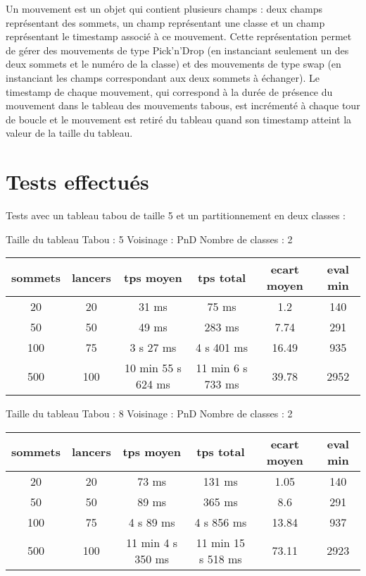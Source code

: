 \documentclass[12pt]{article}
\begin{document}
Un mouvement est un objet qui contient plusieurs champs : deux champs représentant des sommets, un champ représentant une classe et un champ représentant le timestamp associé à ce mouvement. Cette représentation permet de gérer des mouvements de type Pick’n’Drop (en instanciant seulement un des deux sommets et le numéro de la classe) et des mouvements de type swap (en instanciant les champs correspondant aux deux sommets à échanger).
Le timestamp de chaque mouvement, qui correspond à la durée de présence du mouvement dans le tableau des mouvements tabous, est incrémenté à chaque tour de boucle et le mouvement est retiré du tableau quand son timestamp atteint la valeur de la taille du tableau.

\section{Tests effectués}
Tests avec un tableau tabou de taille 5 et un partitionnement en deux classes :





Taille du tableau Tabou : 5
Voisinage : PnD
Nombre de classes : 2

\begin{tabular}{|c|c|c|c|c|c|}
	\hline 
	sommets & lancers & tps moyen & tps total & ecart moyen & eval min\\
	\hline
	20 & 20 & 31 ms & 75 ms & 1.2 & 140 \\
	\hline
	 50 & 50 & 49 ms & 283 ms & 7.74 & 291 \\
	\hline
	 100 & 75 & 3 s 27 ms & 4 s 401 ms & 16.49 & 935 \\
	\hline
	 500 & 100 & 10 min 55 s 624 ms & 11 min 6 s 733 ms & 39.78 & 2952 \\
	\hline
\end{tabular}
\bigskip

Taille du tableau Tabou : 8
Voisinage : PnD
Nombre de classes : 2

\begin{tabular}{|c|c|c|c|c|c|}
	\hline 
	sommets & lancers & tps moyen & tps total & ecart moyen & eval min\\
	\hline
	20 & 20 & 73 ms & 131 ms & 1.05 & 140 \\
	\hline
	 50  &  50  &   89  ms   &  365  ms   &  8.6   &   291  \\
	\hline
	 100  &  75  &  4 s 89   ms   &  4 s  856  ms    &  13.84   &   937  \\
	\hline
	 500 & 100 & 11 min 4 s 350 ms & 11 min 15 s 518 ms & 73.11 & 2923 \\
	\hline
\end{tabular}
\bigskip
\end{document}
